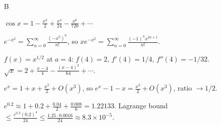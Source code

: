 \documentclass[11pt]{article}
\begin{document}
\begin{answers}{B}
\item $\cos x = 1 - \tfrac{x^2}{2} + \tfrac{x^4}{24} - \tfrac{x^6}{720} + \cdots$
\item $e^{-x^2} = \sum_{n=0}^\infty \tfrac{(-x^2)^n}{n!}$, so $x e^{-x^2} = \displaystyle \sum_{n=0}^\infty \tfrac{(-1)^n x^{2n+1}}{n!}$.
\item $f(x) = x^{1/2}$ at $a = 4$: $f(4) = 2$, $f'(4) = 1/4$, $f''(4) = -1/32$. $\sqrt x = 2 + \tfrac{x-4}{4} - \tfrac{(x-4)^2}{64} + \cdots$.
\item $e^x = 1 + x + \tfrac{x^2}{2} + O(x^3)$, so $e^x - 1 - x = \tfrac{x^2}{2} + O(x^3)$, ratio $\to \boxed{1/2}$.
\item $e^{0.2} \approx 1 + 0.2 + \tfrac{0.04}{2} + \tfrac{0.008}{6} = 1.22133$. Lagrange bound $\le \tfrac{e^{0.2}(0.2)^4}{24} \le \tfrac{1.25 \cdot 0.0016}{24} \approx 8.3 \times 10^{-5}$.
\end{answers}
\end{document}
